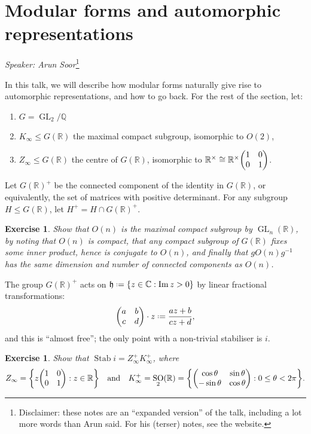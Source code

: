 \documentclass[11pt]{report}
\let\mf\mathfrak
\newcommand{\1}{\mathbbm 1}
\newcommand{\Q}{\mathbb{Q}}
\newcommand{\R}{\mathbb{R}}
\newcommand{\C}{\mathbb{C}}
\newcommand*{\defeq}{\mathrel{\vcenter{\baselineskip0.5ex \lineskiplimit0pt
      \hbox{\scriptsize.}\hbox{\scriptsize.}}}%
  =}
\DeclareMathOperator{\SO}{SO}
\DeclareMathOperator{\GSp}{GSp}
\DeclareMathOperator{\GL}{GL}
\DeclareMathOperator{\Stab}{Stab}
\theoremstyle{plain}
\newcounter{ex}
\newtheorem{exercise}[ex]{Exercise}
\theoremstyle{definition}
\newtheorem{example}[thm]{Example}
\theoremstyle{remark}
\numberwithin{equation}{section}
\begin{document}

\section{Modular forms and automorphic representations}
\label{sec:modul-forms-autom}
\emph{Speaker: Arun Soor}\footnote{Disclaimer: these notes are an ``expanded version'' of the
  talk, including a lot more words than Arun said. For his (terser)
  notes, see the website.}

In this talk, we will describe how modular forms naturally give rise
to automorphic representations, and how to go back.
 For the rest of the section, let:
\begin{enumerate}
\item $G = \GL_{2}/\Q$
\item $K_{\infty} \le G(\R)$ the maximal compact subgroup, isomorphic to $O(2)$,
\item $Z_{\infty} \le G(\R)$ the centre of $G(\R)$, isomorphic to $\R^{\times} \cong \R^{\times}\mqty(1  & 0 \\ 0 & 1)$.
\end{enumerate}

Let $G(\R)^{+}$ be the connected component of the identity in $G(\R)$,
or equivalently, the set of matrices with positive determinant. For
any subgroup $H \le G(\R)$, let $H^{+} = H \cap G(\R)^{+}$.

\begin{exercise}
Show that $O(n)$ is the maximal compact subgroup by $\GL_{n}(\R)$, by noting that
$O(n)$ is compact, that any compact subgroup of $G(\R)$ fixes some
inner product, hence is conjugate to $O(n)$, and finally that
$gO(n)g^{-1}$ has the same dimension and number of connected
components as $O(n)$.
\end{exercise}

The group $G(\R)^{+}$ acts on $\mf h \defeq \{ z \in \C : \Im z > 0\}$ by
linear fractional transformations:
\begin{equation}
  \label{eq:25}
\mqty(a  & b \\ c & d)\cdot z \defeq \frac{az+b}{cz+d},
\end{equation}
and this is ``almost free''; the only point with a non-trivial
stabiliser is $i$.
\begin{exercise}
  Show that $\Stab i = Z_{\infty}^{+}K_{\infty}^{+}$, where
  \begin{equation}
    \label{eq:41}
Z_{\infty} = \qty{z \mqty(1
& 0 \\ 0 & 1) : z \in \R} \qq{and} K_{\infty}^{+} = \SO_{2}(\R) = \qty{\mqty(\cos\theta
& \sin \theta \\ -\sin \theta  & \cos \theta) : 0 \le  \theta < 2\pi}.
  \end{equation}
\end{exercise}
\end{document}
